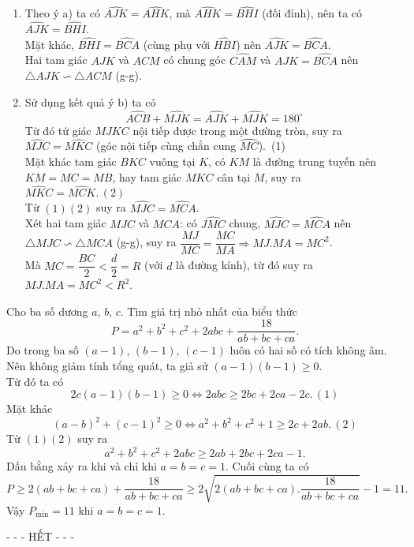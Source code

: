 \begin{ex}
{\begin{enumerate}
{
    }
    \item Theo ý a) ta có $\widehat{AJK}=\widehat{AHK}$, mà $\widehat{AHK}=\widehat{BHI}$ (đối đỉnh), nên ta có $\widehat{AJK}=\widehat{BHI}$.\\
    Mặt khác, $\widehat{BHI}=\widehat{BCA}$ (cùng phụ với $\widehat{HBI}$) nên $\widehat{AJK}=\widehat{BCA}$.\\
    Hai tam giác $AJK$ và $ACM$ có chung góc $\widehat{CAM}$ và $\widehat{AJK}=\widehat{BCA}$ nên $\triangle AJK\backsim \triangle ACM$ (g-g).    
    \item Sử dụng kết quả ý b) ta có
    $$\widehat{ACB}+\widehat{MJK}=\widehat{AJK}+\widehat{MJK}=180^\circ$$
    Từ đó tứ giác $MJKC$ nội tiếp được trong một đường tròn, suy ra $\widehat{MJC}=\widehat{MKC}$ (góc nội tiếp cùng chắn cung $\wideparen{MC}$).\, (1)\\
    Mặt khác tam giác $BKC$ vuông tại $K$, có $KM$ là đường trung tuyến nên $KM=MC=MB$, hay tam giác $MKC$ cân tại $M$, suy ra $\widehat{MKC}=\widehat{MCK}.\, (2)$\\
    Từ $(1)(2)$ suy ra $\widehat{MJC}=\widehat{MCA}$.\\
   	Xét hai tam giác $MJC$ và $MCA$: có $\widehat{JMC}$ chung, $\widehat{MJC}=\widehat{MCA}$ nên $\triangle MJC\backsim\triangle MCA$ (g-g), suy ra $\dfrac{MJ}{MC}=\dfrac{MC}{MA}\Rightarrow MJ.MA=MC^2$.\\
    Mà $MC=\dfrac{BC}{2}<\dfrac{d}{2}=R$ (với $d$ là đường kính), từ đó suy ra $MJ.MA=MC^2<R^2$.

	\end{enumerate}     
    }
\end{ex}

\begin{ex}%
Cho ba số dương $a$, $b$, $c$. Tìm giá trị nhỏ nhất của biểu thức
$$P=a^2+b^2+c^2+2abc+\dfrac{18}{ab+bc+ca}.$$
\loigiai
    {
    Do trong ba số $(a-1)$, $(b-1)$, $(c-1)$ luôn có hai số có tích không âm. Nên không giảm tính tổng quát, ta giả sử $(a-1)(b-1)\ge 0$.\\
    Từ đó ta có 
    $$2c(a-1)(b-1)\ge 0\Leftrightarrow 2abc\ge 2bc+2ca-2c.\, (1)$$
    Mặt khác $$(a-b)^2+(c-1)^2\ge 0\Leftrightarrow a^2+b^2+c^2+1\ge 2c+2ab.\, (2)$$
    Từ $(1)(2)$ suy ra 
    $$a^2+b^2+c^2+2abc\ge 2ab+2bc+2ca-1.$$
    Dấu bằng xảy ra khi và chỉ khi $a=b=c=1$.
    Cuối cùng ta có
    $$P\ge 2(ab+bc+ca)+\dfrac{18}{ab+bc+ca}\ge 2\sqrt{2(ab+bc+ca).\dfrac{18}{ab+bc+ca}}-1=11.$$
    Vậy $P_{\min}=11$ khi $a=b=c=1$.
    }  
\end{ex}
\centerline{- - - HẾT - - -}

